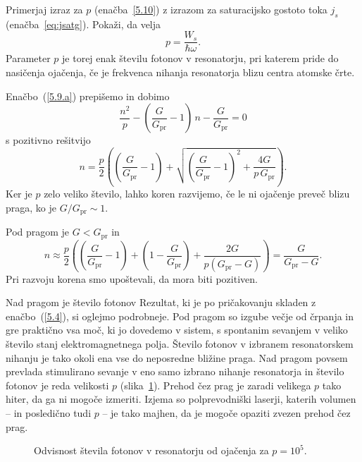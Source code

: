 \begin{definition}
Primerjaj izraz za $p$ (enačba~\ref{5.10}) z izrazom za saturacijsko 
gostoto toka $j_s$ (enačba~\ref{eq:jsatg}). Pokaži, da velja
\begin{equation}
p = \frac{W_s}{\hbar \omega}.
\end{equation}
Parameter $p$ je torej enak številu fotonov v resonatorju, pri katerem pride 
do nasičenja ojačenja, če je frekvenca nihanja resonatorja blizu 
centra atomske črte. 
\end{definition}

Enačbo~(\ref{5.9.a}) prepišemo in dobimo
\begin{equation}
\frac{n^2}{p}-\left(\frac{G}{G_\mathrm{pr}}-1\right)\,n-\frac{G}{G_\mathrm{pr}}=0
\label{5.11}
\end{equation}
s pozitivno rešitvijo 
\begin{equation}
n=\frac{p}{2}\left( \left(\frac{G}{G_\mathrm{pr}}-1\right)+\sqrt{\left(\frac{G}{G_\mathrm{pr}}
-1\right)^{2}+ \frac{4G}{p\,G_\mathrm{pr}}}\right).
\label{5.12}
\end{equation}
Ker je $p$ zelo veliko število, lahko koren razvijemo, če le ni ojačenje
preveč blizu praga, ko je $G/G_\mathrm{pr}\sim 1$. 

Pod pragom je $G<G_\mathrm{pr}$ in 
\begin{equation}
n\approx \frac{p}{2}\left( \left(\frac{G}{G_\mathrm{pr}}-1\right)+\left(1
-\frac{G}{G_\mathrm{pr}}\right)+\frac{2G}{p(G_\mathrm{pr}-G)}\right) =\frac{G}{G_\mathrm{pr}-G}.
\label{5.13}
\end{equation}
Pri razvoju korena smo upoštevali, da mora biti pozitiven. 

Nad pragom je
število fotonov 
Rezultat, ki je po pričakovanju skladen z enačbo~(\ref{5.4}), si oglejmo podrobneje. 
Pod pragom so izgube večje od črpanja in gre praktično vsa moč, ki jo dovedemo v sistem, 
s spontanim sevanjem v veliko število stanj elektromagnetnega polja. 
Število fotonov v izbranem resonatorskem nihanju je tako okoli 
ena vse do neposredne bližine praga. Nad pragom povsem prevlada stimulirano sevanje 
v eno samo izbrano nihanje resonatorja in število fotonov je reda velikosti $p$ (slika~\ref{fig:p}).
Prehod čez prag je zaradi velikega $p$ tako hiter, da ga ni mogoče izmeriti.
Izjema so polprevodniški laserji, katerih 
volumen -- in posledično tudi $p$ -- 
je tako majhen, da je mogoče opaziti zvezen prehod čez prag.
\begin{figure}[h]
\centering
\def\svgwidth{50truemm} 

\caption{Odvisnost števila fotonov v resonatorju od ojačenja za $p=10^5$.}
\label{fig:p}
\end{figure}

